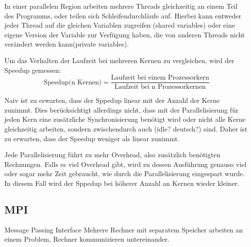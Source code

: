\documentclass{scrreprt}
\begin{document}
	In einer parallelen Region arbeiten mehrere Threads gleichzeitig an einem Teil des Programms, oder teilen sich Schleifendurchläufe auf. Hierbei kann entweder jeder Thread auf die gleichen Variablen zugreifen (shared variables) oder eine eigene Version der Variable zur Verfügung haben, die von anderen Threads nicht verändert werden kann(private variables)\cite[vgl. ][S. 231 f.]{pachecoparallel}. 
	
	Um das Verhalten der Laufzeit bei mehreren Kernen zu vergleichen, wird der Speedup gemessen:
	\[\text{Speedup(n Kernen)}=\frac{\text{Laufzeit bei einem Prozessorkern}}{\text{Laufzeit bei n Prozessorkernen}}\]
	
	Naiv ist zu erwarten, dass der Sppedup linear mit der Anzahl der Kerne zunimmt. Dies berücksichtigt allerdings nicht, dass mit der Parallelisierung für jeden Kern eine zusätzliche Synchronisierung benötigt wird oder nicht alle Kerne gleichzeitig arbeiten, sondern zwischendurch auch (idle? deutsch?) sind. Daher ist zu erwarten, dass der Speedup weniger als linear zunimmt\cite[vgl. ][S. 58 f.]{pachecoparallel}.
	 
	
		
	Jede Parallelisierung führt zu mehr Overhead, also zusätzlich benötigten Rechnungen. Falls es viel Overhead gibt, wird zu dessen Ausführung genauso viel oder sogar mehr Zeit gebraucht, wie durch die Parallelisierung eingespart wurde. In diesem Fall wird der Sppedup bei höherer Anzahl an Kernen wieder kleiner.
	\subsection{MPI}
	\label{subsecmpitheorie}
	Message Passing Interface
	Mehrere Rechner mit separatem Speicher arbeiten an einem Problem, Rechner kommunizieren untereinander.
	
	
		
\end{document}
